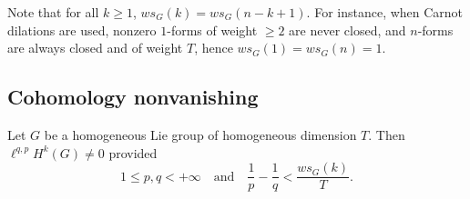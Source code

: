 Note that for all $k\geq 1$, $ws_G(k)=ws_G(n-k+1)$. For instance, when Carnot dilations are used, nonzero $1$-forms of weight $\geq 2$ are never closed, and $n$-forms are always closed and of weight $T$, hence $ws_G(1)=ws_G(n)=1$.

\subsection{Cohomology nonvanishing}

\begin{theo}\label{thm:nonzero}
Let $G$ be a homogeneous Lie group of homogeneous dimension $T$. Then $\ell^{q,p}H^k(G)\not=0$ provided
\[
1\leq p,q<+\infty \quad \text{and} \quad
\frac{1}{p}-\frac{1}{q}<\frac{ws_G(k)}{T}.
\]
\end{theo}

